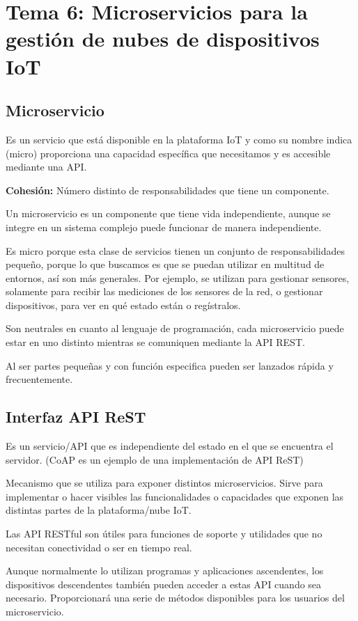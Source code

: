 \documentclass[12pt, twoside, openright]{report} %
\begin{document}
\chapter{Tema 6: Microservicios para la gestión de nubes de dispositivos IoT}
\section{Microservicio}
Es un servicio que está disponible en la plataforma IoT y como su nombre indica (micro) proporciona una capacidad específica que necesitamos y es accesible mediante una API.

\textbf{Cohesión:} Número distinto de responsabilidades que tiene un componente.

Un microservicio es un componente que tiene vida independiente, aunque se integre en un sistema complejo puede funcionar de manera independiente.

Es micro porque esta clase de servicios tienen un conjunto de responsabilidades pequeño, porque lo que buscamos es que se puedan utilizar en multitud de entornos, así son más generales. Por ejemplo, se utilizan para gestionar sensores, solamente para recibir las mediciones de los sensores de la red, o gestionar dispositivos, para ver en qué estado están o regístralos.

Son neutrales en cuanto al lenguaje de programación, cada microservicio puede estar en uno distinto mientras se comuniquen mediante la API REST.

Al ser partes pequeñas y con función especifica pueden ser lanzados rápida y frecuentemente.

\section{Interfaz API ReST}
Es un servicio/API que es independiente del estado en el que se encuentra el servidor. (CoAP es un ejemplo de una implementación de API ReST)

Mecanismo que se utiliza para exponer distintos microservicios. Sirve para implementar o hacer visibles las funcionalidades o capacidades que exponen las distintas partes de la plataforma/nube IoT.

Las API RESTful son útiles para funciones de soporte y utilidades que no necesitan conectividad o ser en tiempo real.

Aunque normalmente lo utilizan programas y aplicaciones ascendentes, los dispositivos descendentes también pueden acceder a estas API cuando sea necesario. Proporcionará una serie de métodos disponibles para los usuarios del microservicio.
\end{document}
